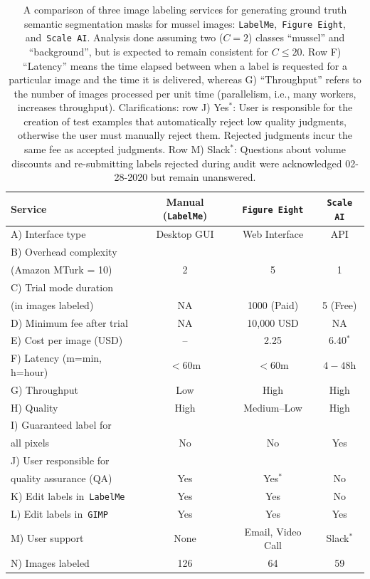 \documentclass[11pt]{article} %
\begin{document}
\begin{table}[]
\centering
\caption{A comparison of three image labeling services for generating ground
truth semantic segmentation masks for mussel images:
\texttt{LabelMe},~\texttt{Figure Eight}, and~\texttt{Scale AI}.
Analysis done assuming two ($C=2$) classes ``mussel'' and ``background'', but
is expected to remain consistent for $C \leq 20$. Row F) ``Latency'' means the
time elapsed between when a label is requested for a particular image and the
time it is delivered, whereas G) ``Throughput'' refers to the number of images
processed per unit time (parallelism, i.e., many workers, increases
throughput). Clarifications: row J) Yes$^*$: User is responsible
for the creation of test examples that automatically reject low quality
judgments, otherwise the user must manually reject them. Rejected judgments 
incur the same fee as accepted judgments. Row M) Slack$^*$: Questions about 
volume discounts and re-submitting labels rejected during audit were 
acknowledged 02-28-2020 but remain unanswered.}
\begin{tabular}{lccc}
\toprule
Service & Manual (\texttt{LabelMe}) & \texttt{Figure Eight} & \texttt{Scale AI} 
\\ \midrule
A) Interface type & Desktop GUI & Web Interface & API \\ \midrule
B) Overhead complexity \\ (Amazon MTurk = 10) & 2 & 5 & 1 \\ \midrule
C) Trial mode duration \\ (in images labeled) & NA & 1000 (Paid) & 5 (Free) \\ 
\midrule
D) Minimum fee after trial & NA & 10,000 USD & NA \\ \midrule
E) Cost per image (USD) & -- & 2.25 & 6.40$^*$ \\ \midrule
F) Latency (m=min, h=hour) & $<60$m & $<60$m & $4-48$h \\ \midrule
G) Throughput & Low & High & High \\ \midrule
H) Quality & High & Medium--Low & High \\ \midrule
I) Guaranteed label for \\ all pixels & No & No & Yes \\ \midrule
J) User responsible for \\ quality assurance (QA) & Yes & Yes$^*$ & No \\  
\midrule
K) Edit labels in~\texttt{LabelMe} & Yes & Yes & No \\ \midrule
L) Edit labels in~\texttt{GIMP} & Yes & Yes & Yes \\ \midrule
M) User support & None & Email, Video Call & Slack$^*$ \\ \midrule
N) Images labeled & 126 & 64 & 59 \\ \bottomrule
\end{tabular}
\label{tab:label-services}
\end{table}
\end{document}
